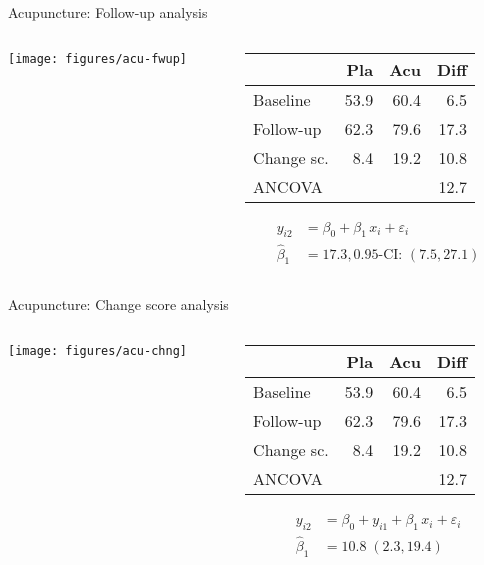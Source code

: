 \documentclass{beamer}
\begin{document}
\begin{frame}{Acupuncture: Follow-up analysis}
\begin{columns}[T]
\begin{column}{5.5cm}
  \texttt{[image: figures/acu-fwup]}
\end{column}
%
\begin{column}{5.5cm}
  \vspace*{1em}\small
  \begin{tabular}{lrrr}
  \hline
             &  Pla &  Acu & Diff \\ \hline
  Baseline   & 53.9 & 60.4 &  6.5 \\
  Follow-up  & 62.3 & 79.6 & 17.3 \\
  Change sc. &  8.4 & 19.2 & 10.8 \\
  ANCOVA     &      &      & 12.7 \\ \hline
  \end{tabular}
\begin{align*}
         y_{i2} &= \beta_0 + \beta_1 \, x_i + \varepsilon_i \\
  \hat{\beta}_1 &= 17.3, 0.95\text{-CI: } (7.5, 27.1)
\end{align*}
\end{column}
\end{columns}
\end{frame}


\begin{frame}{Acupuncture: Change score analysis}
\begin{columns}[T]
\begin{column}{5.5cm}
  \texttt{[image: figures/acu-chng]}
\end{column}
%
\begin{column}{5.5cm}
  \vspace*{1em}\small
  \begin{tabular}{lrrr}
  \hline
             &  Pla &  Acu & Diff \\ \hline
  Baseline   & 53.9 & 60.4 &  6.5 \\
  Follow-up  & 62.3 & 79.6 & 17.3 \\
  Change sc. &  8.4 & 19.2 & 10.8 \\
  ANCOVA     &      &      & 12.7 \\ \hline
  \end{tabular}
\begin{align*}
         y_{i2} &= \beta_0 + y_{i1} + \beta_1 \, x_i + \varepsilon_i \\
  \hat{\beta}_1 &= 10.8 \; (2.3, 19.4)
\end{align*}
\end{column}
\end{columns}
\end{frame}
\end{document}
